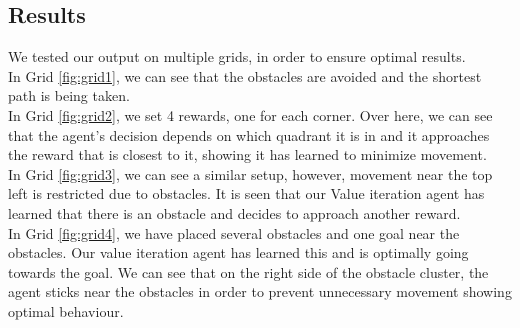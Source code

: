 \documentclass[a4paper, 11pt]{article}
\begin{document}
\subsection{Results}
We tested our output on multiple grids, in order to ensure optimal results. \\ 
In Grid \ref{fig:grid1}, we can see that the obstacles are avoided and the shortest path is being taken. \\
In Grid \ref{fig:grid2}, we set 4 rewards, one for each corner. Over here, we can see that the agent's decision depends on which quadrant it is in and it approaches the reward that is closest to it, showing it has learned to minimize movement. \\
In Grid \ref{fig:grid3}, we can see a similar setup, however, movement near the top left is restricted due to obstacles. It is seen that our Value iteration agent has learned that there is an obstacle and decides to approach another reward. \\
In Grid \ref{fig:grid4}, we have placed several obstacles and one goal near the obstacles. Our value iteration agent has learned this and is optimally going towards the goal. We can see that on the right side of the obstacle cluster, the agent sticks near the obstacles in order to prevent unnecessary movement showing optimal behaviour.
\end{document}
